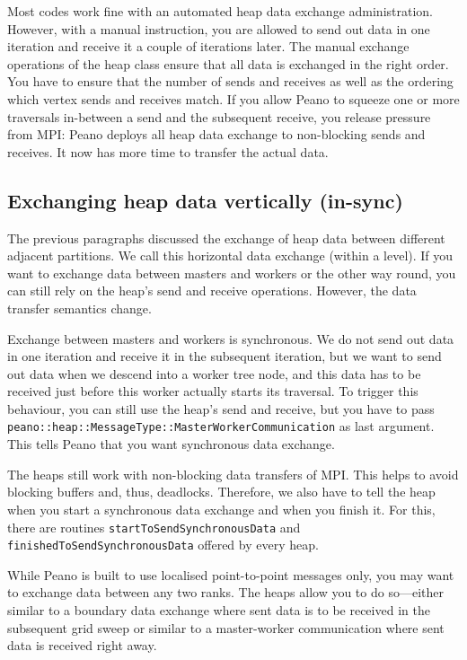Most codes work fine with an automated heap data exchange administration. 
However, with a manual instruction, you are allowed to send out data in one
iteration and receive it a couple of iterations later.
The manual exchange operations of the heap class ensure that all data is
exchanged in the right order. 
You have to ensure that the number of sends and receives as well as the ordering
which vertex sends and receives match.
If you allow Peano to squeeze one or more traversals in-between a send and the
subsequent receive, you release pressure from MPI: 
Peano deploys all heap data exchange to non-blocking sends and receives.
It now has more time to transfer the actual data.
 


\subsection{Exchanging heap data vertically (in-sync)}

The previous paragraphs discussed the exchange of heap data between different
adjacent partitions. 
We call this horizontal data exchange (within a level).
If you want to exchange data between masters and workers or the other way round,
you can still rely on the heap's send and receive operations.
However, the data transfer semantics change.


Exchange between masters and workers is synchronous.
We do not send out data in one iteration and receive it in the subsequent
iteration, but we want to send out data when we descend into a worker tree node,
and this data has to be received just before this worker actually starts its
traversal.
To trigger this behaviour, you can still use the heap's send and receive, but
you have to pass 
\texttt{peano::heap::MessageType::MasterWorkerCommunication} as last argument.
This tells Peano that you want synchronous data exchange.


The heaps still work with non-blocking data transfers of MPI.
This helps to avoid blocking buffers and, thus, deadlocks. 
Therefore, we also have to tell the heap when you start a synchronous data
exchange and when you finish it.
For this, there are routines \texttt{startToSendSynchronousData} and
\texttt{finishedToSendSynchronousData} offered by every heap.


\begin{remark}
While Peano is built to use localised point-to-point messages only, you may want
to exchange data between any two ranks. The heaps allow you to do so---either
similar to a boundary data exchange where sent data is to be received in the
subsequent grid sweep or similar to a master-worker communication where sent
data is received right away.
\end{remark}


